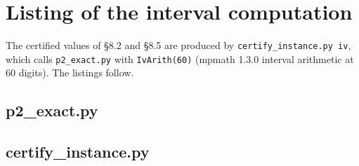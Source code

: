 \documentclass[11pt]{report}
\begin{document}
\appendix
\section{Listing of the interval computation}\label{T12:app:code}
The certified values of \S8.2 and \S8.5 are produced by \texttt{certify\_instance.py iv}, which calls \texttt{p2\_exact.py} with \texttt{IvArith(60)} (mpmath 1.3.0 interval arithmetic at 60 digits). The listings follow.

\subsection*{p2\_exact.py}

\subsection*{certify\_instance.py}

\end{document}
